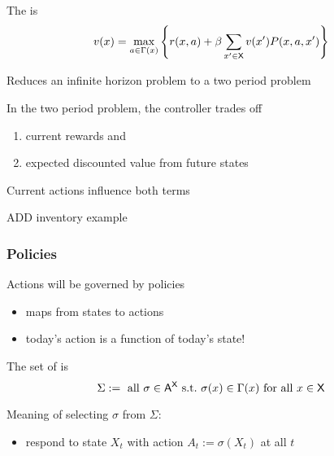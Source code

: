 \begin{frame}
    
    The  is
    \begin{equation*}
            v(x)
            = \max_{a \in \Gamma(x)}
            \left\{
                r(x, a)
                + \beta
                \sum_{x' \in \mathsf X} v(x') P(x, a, x')
            \right\}
    \end{equation*}


    Reduces an infinite horizon problem to a two period
    problem

    In the two period problem, the controller trades off
    \begin{enumerate}
        \item current rewards and 
        \item expected discounted value from future states
    \end{enumerate}

    Current actions influence both terms

\end{frame}


\begin{frame}
    
    ADD inventory example

\end{frame}


\begin{frame}
    \frametitle{Policies}
    
    Actions will be governed by policies
    \begin{itemize}
        \item maps from states to actions
        \vspace{0.5em}
        \item today's action is a function of today's state!
    \end{itemize}

    \vspace{0.5em}
    The set of  is
    \begin{equation*}
        \Sigma := 
        \text{ all }
            \sigma \in \mathsf A^\mathsf X
            \ \mathrm{s.t.}\  
            \sigma(x) \in \Gamma(x) \text{ for all } x \in \mathsf X
    \end{equation*}

    \vspace{0.5em}
    Meaning of selecting $\sigma$ from $\Sigma$: 

    \begin{itemize}
        \item respond to state $X_t$ with action $A_t := \sigma(X_t)$ at all $t$
    \end{itemize}

\end{frame}


